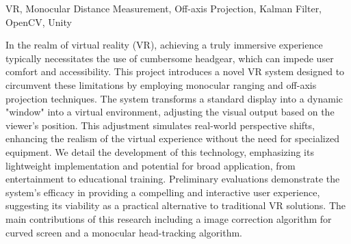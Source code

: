 

\begin{英文摘要}{VR, Monocular Distance Measurement, Off-axis Projection, Kalman Filter, OpenCV, Unity}

In the realm of virtual reality (VR), achieving a truly immersive experience typically necessitates the use of cumbersome headgear, which can impede user comfort and accessibility. This project introduces a novel VR system designed to circumvent these limitations by employing monocular ranging and off-axis projection techniques. The system transforms a standard display into a dynamic "window" into a virtual environment, adjusting the visual output based on the viewer’s position. This adjustment simulates real-world perspective shifts, enhancing the realism of the virtual experience without the need for specialized equipment. We detail the development of this technology, emphasizing its lightweight implementation and potential for broad application, from entertainment to educational training. Preliminary evaluations demonstrate the system’s efficacy in providing a compelling and interactive user experience, suggesting its viability as a practical alternative to traditional VR solutions. The main contributions of this research including a image correction algorithm for curved screen and a monocular head-tracking algorithm.

\end{英文摘要}
